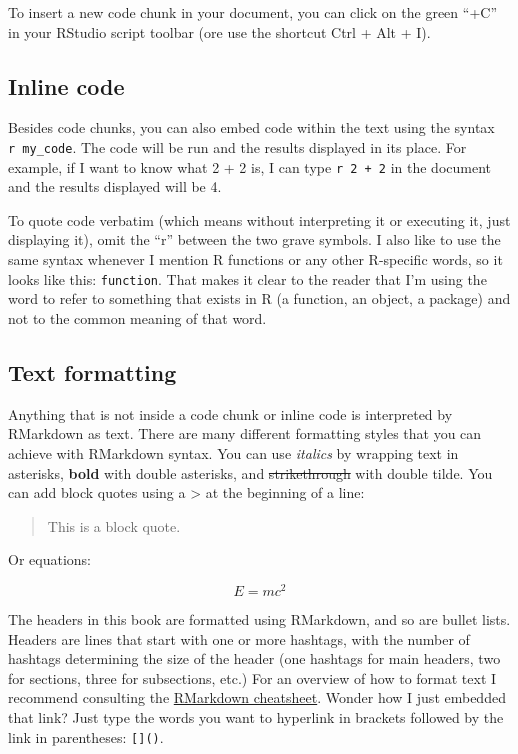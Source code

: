 \documentclass[
]{book}
\begin{document}
To insert a new code chunk in your document, you can click on the green ``+C'' in
your RStudio script toolbar (ore use the shortcut Ctrl + Alt + I).

\hypertarget{inline-code}{%
\subsection{Inline code}\label{inline-code}}

Besides code chunks, you can also embed code within the text using the syntax
\texttt{\textasciigrave{}r\ my\_code\textasciigrave{}}. The code will be run and the results displayed in
its place. For example, if I want to know what 2 + 2 is, I can type
\texttt{\textasciigrave{}r\ 2\ +\ 2\textasciigrave{}} in the document and the results displayed will be
4.

To quote code verbatim (which means without interpreting it or executing it,
just displaying it), omit the ``r'' between the two grave symbols. I also like to
use the same syntax whenever I mention R functions or any other R-specific words,
so it looks like this: \texttt{function}. That makes it clear to the reader that I'm
using the word to refer to something that exists in R (a function, an object, a package) and not to the common meaning of that word.

\hypertarget{text-formatting}{%
\subsection{Text formatting}\label{text-formatting}}

Anything that is not inside a code chunk or inline code is interpreted by
RMarkdown as text. There are many different formatting styles that you can
achieve with RMarkdown syntax. You can use \emph{italics} by wrapping text in
asterisks, \textbf{bold} with double asterisks, and \st{strikethrough} with double
tilde. You can add block quotes using a \textgreater{} at the beginning of a line:

\begin{quote}
This is a block quote.
\end{quote}

Or equations:

\[E = mc^{2}\]

The headers in this book are formatted using RMarkdown, and so are bullet lists.
Headers are lines that start with one or more hashtags, with the number of
hashtags determining the size of the header (one hashtags for main headers, two
for sections, three for subsections, etc.)
For an overview of how to format text I recommend consulting the \href{https://github.com/rstudio/cheatsheets/raw/master/rmarkdown-2.0.pdf}{RMarkdown cheatsheet}.
Wonder how I just embedded that link? Just type the words you want to
hyperlink in brackets followed by the link in parentheses: \texttt{{[}{]}()}.
\end{document}
